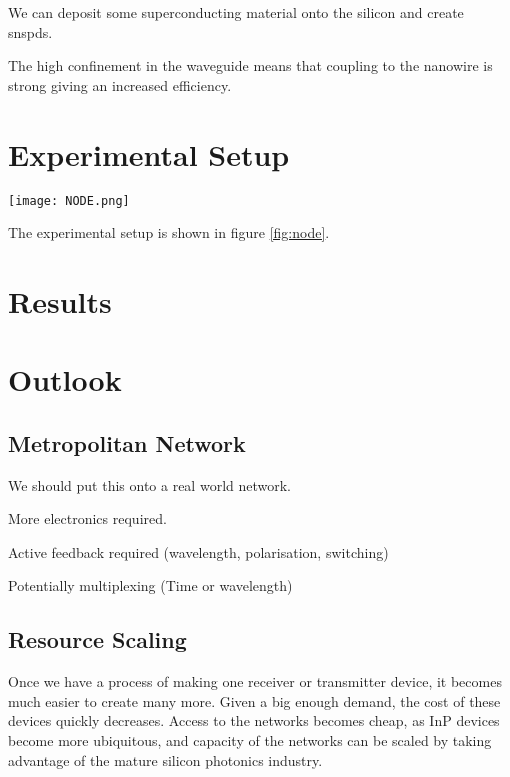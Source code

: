 We can deposit some superconducting material onto the silicon and create \acp{snspd}. 

The high confinement in the waveguide means that coupling to the nanowire is strong giving an increased efficiency. 

\section{Experimental Setup}

\begin{sidewaysfigure}
	\centering
	\texttt{[image: NODE.png]}
	\caption[Fully integrated QKD setup]{Experimental setup for fully integrated quantum key distribution. Alice and Bob use independent InP devices which generate BB84 states on-chip. The receiver (Charlie) is an SOI device with grating couplers and waveguide-integrated detectors.}
	\label{fig:node}
\end{sidewaysfigure}

The experimental setup is shown in figure \ref{fig:node}. 

\section{Results}

\section{Outlook}

\subsection{Metropolitan Network}

We should put this onto a real world network.

More electronics required.

Active feedback required (wavelength, polarisation, switching)

Potentially multiplexing (Time or wavelength)

\subsection{Resource Scaling}

Once we have a process of making one receiver or transmitter device, it becomes much easier to create many more. Given a big enough demand, the cost of these devices quickly decreases. Access to the networks becomes cheap, as \ac{InP} devices become more ubiquitous, and capacity of the networks can be scaled by taking advantage of the mature silicon photonics industry.

